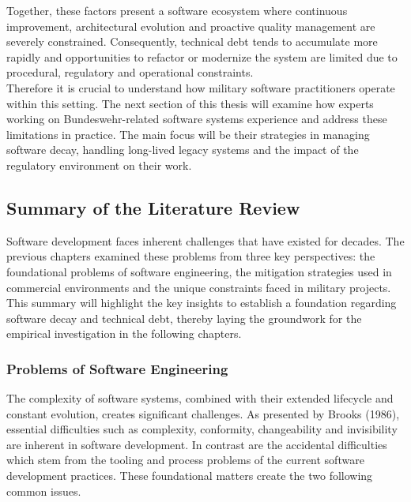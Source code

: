 Together, these factors present a software ecosystem where continuous improvement, architectural evolution and proactive quality management are severely constrained. Consequently, technical debt tends to accumulate more rapidly and opportunities to refactor or modernize the system are limited due to
procedural, regulatory and operational constraints.\\

Therefore it is crucial to understand how military software practitioners operate within this setting. The next section of this thesis will examine how experts working on Bundeswehr-related software systems experience and address these limitations in practice.
The main focus will be their strategies in managing software decay, handling long-lived legacy systems and the impact of the regulatory environment on their work.

\subsection{Summary of the Literature Review}
Software development faces inherent challenges that have existed for decades. The previous chapters examined these problems from three key perspectives: the foundational problems of software engineering, the mitigation strategies used in commercial environments and the unique constraints faced in military projects.
This summary will highlight the key insights to establish a foundation regarding software decay and technical debt, thereby laying the groundwork for the empirical investigation in the following chapters.\\

\subsubsection{Problems of Software Engineering}
The complexity of software systems, combined with their extended lifecycle and constant evolution, creates significant challenges. As presented by Brooks (1986), essential difficulties such as complexity, conformity, changeability and invisibility are inherent in software development.
In contrast are the accidental difficulties which stem from the tooling and process problems of the current software development practices.
These foundational matters create the two following common issues.\\

